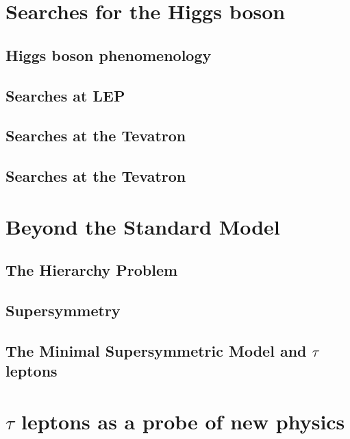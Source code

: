 \section{Searches for the Higgs boson}
\subsection{Higgs boson phenomenology}
\subsection{Searches at LEP}
\subsection{Searches at the Tevatron}
\subsection{Searches at the Tevatron}

\section{Beyond the Standard Model}
\subsection{The Hierarchy Problem}
\subsection{Supersymmetry}
\subsection{The Minimal Supersymmetric Model and $\tau$ leptons}

\section{$\tau$ leptons as a probe of new physics}

\ifx\master\undefined\fi

